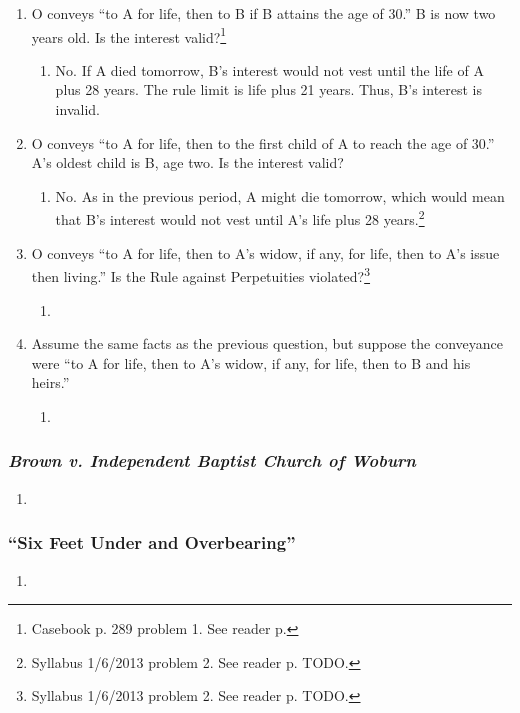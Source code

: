 \begin{enumerate}
    \item O conveys ``to A for life, then to B if B attains the age of 30.'' B 
    is now two years old. Is the interest valid?\footnote{Casebook p. 289 
    problem 1. See reader p.}
    \begin{enumerate}
        \item No. If A died tomorrow, B's interest would not vest until the 
        life of A plus 28 years. The rule limit is life plus 21 years. Thus, 
        B's interest is invalid.
    \end{enumerate}
    \item O conveys ``to A for life, then to the first child of A to reach the 
    age of 30.'' A's oldest child is B, age two. Is the interest valid?
    \begin{enumerate}
        \item No. As in the previous period, A might die tomorrow, which would 
        mean that B's interest would not vest until A's life plus 28 
        years.\footnote{Syllabus 1/6/2013 problem 2. See reader p.  TODO.}
    \end{enumerate}
    \item O conveys ``to A for life, then to A's widow, if any, for life, then 
    to A's issue then living.'' Is the Rule against Perpetuities 
    violated?\footnote{Syllabus 1/6/2013 problem 2. See reader p.  TODO.}
    \begin{enumerate}
        \item %
    \end{enumerate}
    \item Assume the same facts as the previous question, but suppose the 
    conveyance were ``to A for life, then to A's widow, if any, for life, then 
    to B and his heirs.''
    \begin{enumerate}
        \item %
    \end{enumerate}
\end{enumerate}

\subsubsection{\emph{Brown v. Independent Baptist Church of Woburn}}

\begin{enumerate}
    \item %
\end{enumerate}

\subsubsection{``Six Feet Under and Overbearing''}
\begin{enumerate}
    \item %
\end{enumerate}


